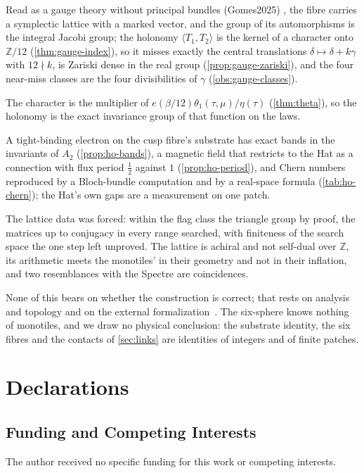 \documentclass[11pt,a4paper]{article}
\newcommand{\ZZ}{\mathbb{Z}}
\theoremstyle{plain}
\theoremstyle{definition}
\begin{document}
Read as a gauge theory without principal bundles (Gomes2025) \cite{Gomes}, the fibre carries a symplectic lattice with
a marked vector, and the group of its automorphisms is the integral Jacobi group; the
holonomy $\langle T_1,T_2\rangle$ is the kernel of a character onto $\ZZ/12$ (\cref{thm:gauge-index}), so it misses
exactly the central translations $\delta\mapsto\delta+k\gamma$ with $12\nmid k$, is Zariski dense in the real
group (\cref{prop:gauge-zariski}), and the four near-miss classes are the four divisibilities of
$\gamma$ (\cref{obs:gauge-classes}).

The character is the multiplier of $e(\beta/12)\theta_1(\tau,\mu)/\eta(\tau)$ (\cref{thm:theta}), so the holonomy
is the exact invariance group of that function on the laws.

A tight-binding electron on the cusp fibre's substrate has exact bands in the invariants of
$A_2$ (\cref{prop:ho-bands}), a magnetic field that restricts to the Hat as a connection with flux period $\tfrac12$ against $1$
(\cref{prop:ho-period}), and Chern numbers reproduced by a Bloch-bundle computation and by a real-space formula
(\cref{tab:ho-chern}); the Hat's own gaps are a measurement on one patch.

The lattice data was forced: within the flag class the triangle group by proof, the
matrices up to conjugacy in every range searched, with finiteness of the search
space the one step left unproved. The lattice is achiral and not self-dual over
$\ZZ$, its arithmetic meets the monotiles' in their geometry and not in their
inflation, and two resemblances with the Spectre are coincidences.

None of this bears on whether the construction is correct; that rests on analysis
and topology and on the external formalization~\cite{Alexeev}. The six-sphere
knows nothing of monotiles, and we draw no physical conclusion: the substrate
identity, the six fibres and the contacts of \cref{sec:links} are identities of
integers and of finite patches.



\footnotesize

\section*{Declarations}

\subsection*{Funding and Competing Interests}
The author received no specific funding for this work or competing interests.
\end{document}
